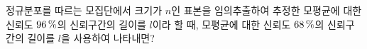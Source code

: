정규분포를 따르는 모집단에서 크기가 $n$인 표본을 임의추출하여 추정한 모평균에 대한 신뢰도 $96\mkern3mu \%$의 신뢰구간의 길이를 $l$이라 할 때, 모평균에 대한 신뢰도 $68\mkern3mu \%$의 신뢰구간의 길이를 $l$을 사용하여 나타내면? 
